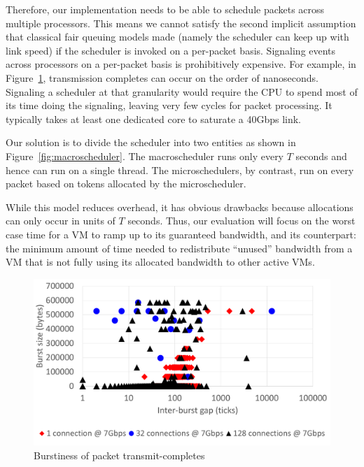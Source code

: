 Therefore, our implementation needs to be able to schedule packets across
multiple processors.  This means we cannot satisfy the second implicit
assumption that classical fair queuing models made (namely the scheduler can
keep up with link speed) if the scheduler is invoked on a per-packet basis.
Signaling events across processors on a per-packet basis is prohibitively
expensive.  For example, in Figure~\ref{completesburst}, transmission completes
can occur on the order of nanoseconds.  Signaling a scheduler at that
granularity would require the CPU to spend most of its time doing the signaling,
leaving very few cycles for packet processing.  It typically takes at least one
dedicated core to saturate a 40Gbps link. 

Our solution is to divide the scheduler into two entities as shown in
Figure~\ref{fig:macroscheduler}.   The macroscheduler runs only every $T$
seconds and hence can run on a single thread.   The microschedulers, by
contrast, run on every packet based on tokens allocated by the microscheduler.   

While this model reduces overhead, it has obvious drawbacks because allocations
can only occur in units of $T$ seconds. Thus, our evaluation will focus on the
worst case time for a VM to ramp up to its guaranteed bandwidth, and its
counterpart: the minimum amount of time needed to redistribute ``unused''
bandwidth from a VM that is not fully using its allocated bandwidth to other
active VMs. 
\begin{figure}
\centering
\includegraphics[width=0.7\columnwidth, trim=60pt 20mm 0pt 8mm]{figures/completesburst}
\caption{Burstiness of packet transmit-completes}
\label{completesburst}
\vspace{-3mm}
\end{figure}
